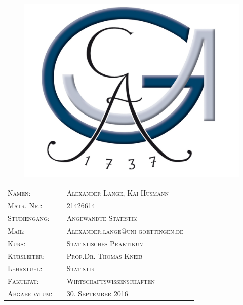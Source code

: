 \documentclass{Vorlage}
\begin{document}

\begin{titlepage}

\begin{figure}
 \begin{center}
 \includegraphics[scale=0.8]{Pictures/logo3}
 \end{center}
\end{figure}
\vspace*{3cm}





\vspace{1cm}

\begin{tabular}{p{3.5cm}|p{0.1cm} p{10cm}l}
\textsc{Namen:} & & \textsc{Alexander Lange, Kai Husmann}\\
\textsc{Matr. Nr.:} & & \textsc{21426614}\\
\textsc{Studiengang:} & & \textsc{Angewandte Statistik}\\
\textsc{Mail:} & & \textsc{Alexander.lange$ @ $uni-goettingen.de}\\
\textsc{Kurs:} & & \textsc{Statistisches Praktikum}\\
\textsc{Kursleiter:} & & \textsc{Prof.Dr. Thomas Kneib}\\
\textsc{Lehrstuhl:} & & \textsc{Statistik}\\
\textsc{Fakultät:} & & \textsc{Wirtschaftswissenschaften}\\
\textsc{Abgabedatum:} & & \textsc{30. September 2016}\\
\end{tabular}
\end{titlepage}
\end{document}
